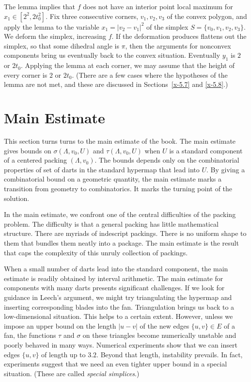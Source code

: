 The lemma implies that $f$ does not have an interior point local maximum
for $x_1\in[2^2,2t_0^2]$.  Fix three consecutive corners, $v_1,v_2,v_3$
of the convex polygon, and apply the lemma to the variable $x_1 =
|v_2-v_1|^2$ of the simplex $S=\{v_0,v_1,v_2,v_3\}$. We deform the simplex,
increasing $f$.  If the deformation produces flattens out the simplex, 
so that some
dihedral angle is $\pi$, then the arguments for nonconvex components bring
us eventually back to the convex situation. Eventually $y_1$ is $2$ or
$2t_0$.  Applying the lemma at each corner, we may assume that the
height of every corner is $2$ or $2t_0$.   (There are a few cases where
the hypotheses of the lemma are not met, and these are discussed in
Sections~\ref{x-5.7} and \ref{x-5.8}.)





\section{Main Estimate} %
    \label{sec:the-main-theorem}

This section turns turns to the main estimate of the book.
The main estimate gives bounds on $\sigma(\Lambda,v_0,U)$ and
$\tau(\Lambda,v_0,U)$ when $U$ is a standard component of 
a centered packing $(\Lambda,v_0)$.  The bounds depends only
on the combinatorial properties of set of darts in the standard
hypermap that lead into $U$.  By giving a combinatorial bound
on a geometric quantity, the main estimate 
marks a transition from geometry to combinatorics.  It
marks the turning point of the solution.

In the main estimate, we confront one of the central difficulties of
the packing problem.  The difficulty is that a general
packing has little mathematical structure.  There
are myriads of indescript packings.  There is no uniform
shape to them that bundles them neatly into a package.  The
main estimate is the result that
caps the complexity of this unruly collection
of packings.

When a small number of darts lead into the standard component,
the main estimate is readily obtained by interval arithmetic.  The
main estimate for components with many darts presents significant
challenges.  If we look for guidance in Leech's argument,
we might try triangulating the hypermap and inserting corresponding
blades into the fan.  Triangulation brings us back to a low-dimensional
situation.  This helps to a certain extent.  However, unless
we impose an upper bound on the length $|u-v|$ of
the new edges $\{u,v\}\in E$ of a fan, the
functions $\tau$ and $\sigma$ on these triangles become numerically
unstable and poorly behaved in many ways. 
Numerical experiments show
that we can insert edges $\{u,v\}$ of length up to $3.2$.  Beyond that
length, instability prevails.
In fact, experiments suggest that
we need an even tighter upper bound in a special situation.  (These
are called {\it special simplices}.)

